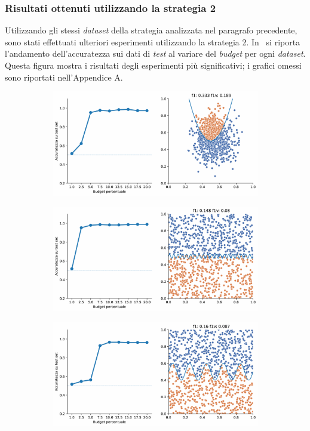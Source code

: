 \subsubsection{Risultati ottenuti utilizzando la strategia 2}
Utilizzando gli stessi \emph{dataset} della strategia analizzata nel paragrafo precedente, sono stati effettuati ulteriori esperimenti utilizzando la strategia 2.
In~ si riporta l'andamento dell'accuratezza sui dati di \emph{test} al variare del \emph{budget} per ogni \emph{dataset}.
Questa figura mostra i risultati degli esperimenti più significativi; i grafici omessi sono riportati nell'Appendice A.

\begin{figure}[b!]
    \begin{subfigure}{\textwidth}
        \centering
        \includegraphics[width=.8\textwidth]{img/2d_v2/4.pdf}
    \end{subfigure}%
    \hfill
    \begin{subfigure}{\textwidth}
        \centering
        \includegraphics[width=.8\textwidth]{img/2d_v2/7.pdf}
    \end{subfigure}
    \hfill
    \begin{subfigure}{\textwidth}
        \centering
        \includegraphics[width=.8\textwidth]{img/2d_v2/12.pdf}

\end{subfigure}
\end{figure}
